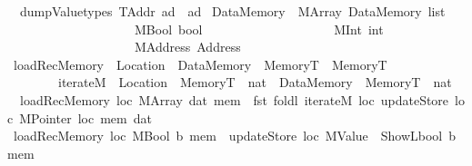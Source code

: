 \begin{isabellebody}
\ {\isacharbar}{\kern0pt}\ {\isachardoublequoteopen}dump\isactrlsub V\isactrlsub a\isactrlsub l\isactrlsub u\isactrlsub e\isactrlsub t\isactrlsub y\isactrlsub p\isactrlsub e\isactrlsub s\ TAddr\ ad\ {\isacharequal}{\kern0pt}\ ad{\isachardoublequoteclose}%
\isadelimdocument
%
\endisadelimdocument
%
\isatagdocument
%
\isamarkuptrue%
%
\endisatagdocument
{\isafolddocument}%
%
\isadelimdocument
%
\endisadelimdocument
{}\isamarkupfalse%
\ Data\isactrlsub M\isactrlsub e\isactrlsub m\isactrlsub o\isactrlsub r\isactrlsub y\ {\isacharequal}{\kern0pt}\ MArray\ {\isachardoublequoteopen}Data\isactrlsub M\isactrlsub e\isactrlsub m\isactrlsub o\isactrlsub r\isactrlsub y\ list{\isachardoublequoteclose}\isanewline
\ \ \ \ \ \ \ \ \ \ \ \ \ \ \ \ \ \ \ {\isacharbar}{\kern0pt}\ MBool\ bool\isanewline
\ \ \ \ \ \ \ \ \ \ \ \ \ \ \ \ \ \ \ {\isacharbar}{\kern0pt}\ MInt\ int\isanewline
\ \ \ \ \ \ \ \ \ \ \ \ \ \ \ \ \ \ \ {\isacharbar}{\kern0pt}\ MAddress\ Address\isanewline
\isanewline
\isanewline
{}\isamarkupfalse%
\ loadRec\isactrlsub M\isactrlsub e\isactrlsub m\isactrlsub o\isactrlsub r\isactrlsub y\ {\isacharcolon}{\kern0pt}{\isacharcolon}{\kern0pt}\ {\isachardoublequoteopen}Location\ {\isasymRightarrow}\ Data\isactrlsub M\isactrlsub e\isactrlsub m\isactrlsub o\isactrlsub r\isactrlsub y\ {\isasymRightarrow}\ MemoryT\ {\isasymRightarrow}\ MemoryT{\isachardoublequoteclose}\ \isanewline
\ \ \ \ \ \ \ \ iterateM\ {\isacharcolon}{\kern0pt}{\isacharcolon}{\kern0pt}\ {\isachardoublequoteopen}Location\ {\isasymRightarrow}\ MemoryT\ {\isasymtimes}\ nat\ {\isasymRightarrow}\ Data\isactrlsub M\isactrlsub e\isactrlsub m\isactrlsub o\isactrlsub r\isactrlsub y\ {\isasymRightarrow}\ MemoryT\ {\isasymtimes}\ nat{\isachardoublequoteclose}\ \isanewline
\ \ {\isachardoublequoteopen}loadRec\isactrlsub M\isactrlsub e\isactrlsub m\isactrlsub o\isactrlsub r\isactrlsub y\ loc\ {\isacharparenleft}{\kern0pt}MArray\ dat{\isacharparenright}{\kern0pt}\ mem\ {\isacharequal}{\kern0pt}\ fst\ {\isacharparenleft}{\kern0pt}foldl\ {\isacharparenleft}{\kern0pt}iterateM\ loc{\isacharparenright}{\kern0pt}\ {\isacharparenleft}{\kern0pt}updateStore\ loc\ {\isacharparenleft}{\kern0pt}MPointer\ loc{\isacharparenright}{\kern0pt}\ mem{\isacharcomma}{\kern0pt}{}{\isacharparenright}{\kern0pt}\ dat{\isacharparenright}{\kern0pt}{\isachardoublequoteclose}\isanewline
{\isacharbar}{\kern0pt}\ {\isachardoublequoteopen}loadRec\isactrlsub M\isactrlsub e\isactrlsub m\isactrlsub o\isactrlsub r\isactrlsub y\ loc\ {\isacharparenleft}{\kern0pt}MBool\ b{\isacharparenright}{\kern0pt}\ mem\ {\isacharequal}{\kern0pt}\ updateStore\ loc\ {\isacharparenleft}{\kern0pt}{\isacharparenleft}{\kern0pt}MValue\ {\isasymcirc}\ ShowL\isactrlsub b\isactrlsub o\isactrlsub o\isactrlsub l{\isacharparenright}{\kern0pt}\ b{\isacharparenright}{\kern0pt}\ mem\ {\isachardoublequoteclose}\isanewline

\end{isabellebody}
